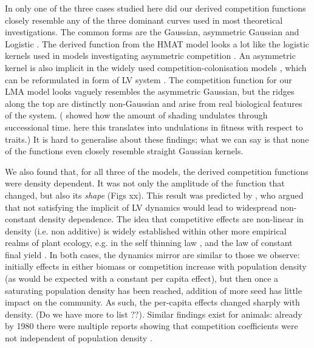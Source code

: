 \documentclass[a4paper,11pt]{article}
\begin{document}
In only one of the three cases studied here did our derived competition
functions closely resemble any of the three dominant curves used in most
theoretical investigations. The common forms are the Gaussian, asymmetric
Gaussian \citet{Roughgarden-1979} and Logistic  \citep[e.g.][]{Kisdi-1999,
Law-1997}. The derived function from the HMAT model looks a lot
like the logistic kernels used in models investigating asymmetric competition
\citep{Kisdi-1999, Law-1997}.  An asymmetric kernel is also implicit in
the widely used competition-colonisation models  \citep{Geritz-1999,
Calcagno-2006}, which can be reformulated in form of LV system
\citep{Calcagno-2006}. The competition function for our LMA model looks
vaguely resembles the asymmetric Gaussian, but the ridges along the top are
distinctly non-Gaussian and arise from real biological features of the system. 
(\citet{Falster-2011} showed how the amount of shading undulates through 
successional time. here this translates into undulations in fitness with
respect to traits.) It is hard to generalise about these findings; what we
can say is that none of the functions even closely resemble straight Gaussian
kernels. 

We also found that, for all three of the models, the derived competition
functions were density dependent. It was not only the amplitude of the
function that changed, but also its \emph{shape} (Figs xx). This result was
predicted by \citet{Abrams-1980}, who argued that not satisfying the implicit
of LV dynamics would lead to widespread non-constant density dependence. The
idea that competitive effects are non-linear in density (i.e. non additive) is
widely established within other more empirical realms of plant ecology, e.g.
in the self thinning law \citep{Westoby-1984}, and the law of constant final
yield \citep{Weiner-2010}. In both cases, the dynamics mirror are similar to
those we observe: initially effects in either biomass or competition increase with population
density (as would be expected with a constant per capita effect), but then
once a saturating population density has been reached, addition of more seed
has little impact on the community. As such, the per-capita effects changed
sharply with density. (Do we have more to list ??). Similar findings
exist for animals: already by 1980 there were  multiple reports showing that
competition coefficients were not independent of population density
\citep{Abrams-1980}.
\end{document}
